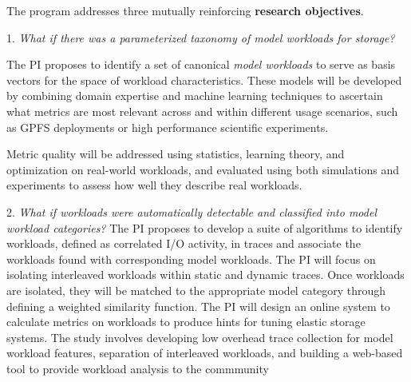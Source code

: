 The program addresses three mutually reinforcing \textbf{research objectives}.
\begin{myitemize}

\item[1.]
\emph{What if there was a parameterized taxonomy of \textit{model workloads} for
storage?}

The PI proposes to identify a set of canonical \textit{model workloads} to serve as basis vectors for the space
of workload characteristics.  These models will be developed by combining domain expertise and machine learning techniques to ascertain what
metrics are most relevant across and within different usage scenarios, such as
GPFS deployments or high performance scientific experiments.  

Metric quality will be addressed using
statistics, learning theory, and optimization on 
real-world workloads, and evaluated using both simulations and experiments to assess how well they describe real workloads.

\item[2.]
\emph{What if workloads were automatically detectable and classified into
\textit{model workload} categories?}
The PI proposes to develop a suite of algorithms to identify workloads, defined as correlated I/O activity, in traces and associate the workloads found with corresponding model
workloads.  The PI will focus on isolating interleaved workloads within static and dynamic traces.  Once workloads are isolated, they will be matched to the appropriate model category through defining a weighted similarity function.  The PI will design an online system to calculate metrics on workloads to produce hints for tuning elastic storage systems.
The study involves developing low overhead trace collection for model workload
features, separation of interleaved workloads, and building a web-based tool to provide workload analysis to the commmunity 


\end{myitemize}
